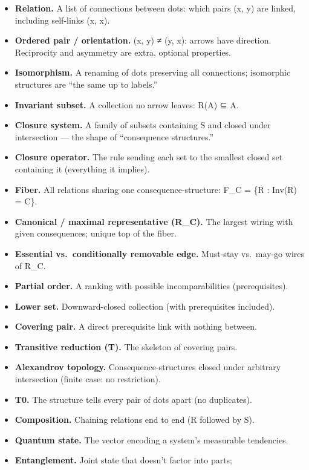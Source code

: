\documentclass[
  11pt,
]{book}
\providecommand{\tightlist}{%
  \setlength{\itemsep}{0pt}\setlength{\parskip}{0pt}}
\begin{document}
\begin{itemize}
\tightlist
\item
  \textbf{Relation.} A list of connections between dots: which pairs (x,
  y) are linked, including self-links (x, x).
\item
  \textbf{Ordered pair / orientation.} (x, y) ≠ (y, x): arrows have
  direction. Reciprocity and asymmetry are extra, optional properties.
\item
  \textbf{Isomorphism.} A renaming of dots preserving all connections;
  isomorphic structures are ``the same up to labels.''
\item
  \textbf{Invariant subset.} A collection no arrow leaves: R(A) ⊆ A.
\item
  \textbf{Closure system.} A family of subsets containing S and closed
  under intersection --- the shape of ``consequence structures.''
\item
  \textbf{Closure operator.} The rule sending each set to the smallest
  closed set containing it (everything it implies).
\item
  \textbf{Fiber.} All relations sharing one consequence-structure: F\_C
  = \{R : Inv(R) = C\}.
\item
  \textbf{Canonical / maximal representative (R\_C).} The largest wiring
  with given consequences; unique top of the fiber.
\item
  \textbf{Essential vs.~conditionally removable edge.} Must-stay
  vs.~may-go wires of R\_C.
\item
  \textbf{Partial order.} A ranking with possible incomparabilities
  (prerequisites).
\item
  \textbf{Lower set.} Downward-closed collection (with prerequisites
  included).
\item
  \textbf{Covering pair.} A direct prerequisite link with nothing
  between.
\item
  \textbf{Transitive reduction (T).} The skeleton of covering pairs.
\item
  \textbf{Alexandrov topology.} Consequence-structures closed under
  arbitrary intersection (finite case: no restriction).
\item
  \textbf{T0.} The structure tells every pair of dots apart (no
  duplicates).
\item
  \textbf{Composition.} Chaining relations end to end (R followed by S).
\item
  \textbf{Quantum state.} The vector encoding a system's measurable
  tendencies.
\item
  \textbf{Entanglement.} Joint state that doesn't factor into parts;

\end{itemize}
\end{document}
